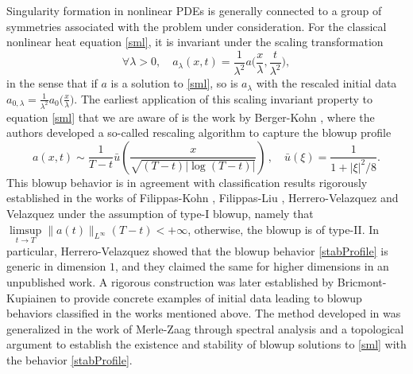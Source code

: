 \documentclass[12pt]{caltech_thesis}
\numberwithin{equation}{section}
\begin{document}
Singularity formation in nonlinear PDEs is generally connected to a group of symmetries associated with the problem under consideration. For the classical nonlinear heat equation \eqref{sml}, it is invariant under the scaling transformation 
\begin{equation}\label{def:scaling}
\forall \lambda > 0, \quad a_\lambda(x,t) = \frac{1}{\lambda^2}a\Big( \frac{x}{\lambda}, \frac{t}{\lambda^2}\Big),
\end{equation}
in the sense that if $a$ is a solution to \eqref{sml}, so is $a_\lambda$ with the rescaled initial data $a_{0, \lambda} = \frac{1}{\lambda^2}a_{0}\big(\frac{x }\lambda \big)$. The earliest application of this scaling invariant property to equation \eqref{sml} that we are  aware of is the work by Berger-Kohn \cite{berger1988rescaling}, where the authors developed a so-called rescaling algorithm to capture the blowup profile 
\begin{equation}\label{stabProfile}
a(x, t) \sim \frac{1}{T-t} \bar{u}\left(\frac{x}{\sqrt{(T-t)|\log (T-t)|}}\right)\,, \quad \bar{u}(\xi)=\frac{1}{1+|\xi|^2 / 8}.
\end{equation}
This blowup behavior is in agreement with classification results rigorously established in the works of Filippas-Kohn \cite{filippas1992refined}, Filippas-Liu \cite{filippas1993blowup}, Herrero-Velazquez \cite{HVaihn93} and Velazquez \cite{velazquez1992higher} under the assumption of type-I blowup, namely that  $\limsup\limits_{t\to T}\|a(t)\|_{L^\infty} (T-t) < +\infty$, otherwise, the blowup is of type-II.
In particular, Herrero-Velazquez \cite{HVasnsp92} showed that the blowup behavior \eqref{stabProfile} is generic in dimension $1$, and they claimed the same for higher dimensions in an unpublished work. A rigorous construction was later established by Bricmont-Kupiainen \cite{bricmont1994universality} to provide concrete examples of initial data leading to blowup behaviors classified in the works mentioned above. The method developed in \cite{bricmont1994universality} was generalized in the work of Merle-Zaag \cite{merle1997stability} through spectral analysis and a topological argument to establish the existence and stability of blowup solutions to \eqref{sml} with the behavior \eqref{stabProfile}. 
\end{document}
